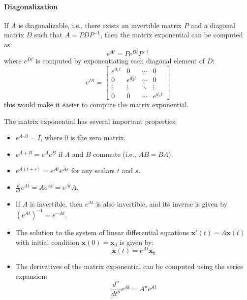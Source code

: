 \documentclass[11pt]{article}
\begin{document}
\paragraph{Diagonalization} If \( A \) is diagonalizable, i.e., there exists an invertible matrix \( P \) and a diagonal matrix \( D \) such that \( A = PDP^{-1} \), then the matrix exponential can be computed as:
\begin{equation}
e^{At} = Pe^{Dt}P^{-1}
\end{equation}
where \( e^{Dt} \) is computed by exponentiating each diagonal element of \( D \):
\begin{equation}
e^{Dt} = \begin{bmatrix}
e^{d_1t} & 0 & \cdots & 0 \\
0 & e^{d_2t} & \cdots & 0 \\
\vdots & \vdots & \ddots & \vdots \\
0 & 0 & \cdots & e^{d_nt}
\end{bmatrix}
\end{equation}
this would make it easier to compute the matrix exponential.

\begin{definition}
    The matrix exponential has several important properties:
    \begin{itemize}
        \item \( e^{A \cdot 0} = I \), where \( 0 \) is the zero matrix.
        \item \( e^{A+B} = e^{A}e^{B} \) if \( A \) and \( B \) commute (i.e., \( AB = BA \)).
        \item \( e^{A(t+s)} = e^{At}e^{As} \) for any scalars \( t \) and \( s \).
        \item \( \frac{d}{dt}e^{At} = Ae^{At} = e^{At}A \).
        \item If \( A \) is invertible, then \( e^{At} \) is also invertible, and its inverse is given by \( (e^{At})^{-1} = e^{-At} \).
        \item The solution to the system of linear differential equations \( \mathbf{x}'(t) = A\mathbf{x}(t) \) with initial condition \( \mathbf{x}(0) = \mathbf{x}_0 \) is given by:
        \begin{equation}
        \mathbf{x}(t) = e^{At}\mathbf{x}_0
        \end{equation}
        \item The derivatives of the matrix exponential can be computed using the series expansion:
        \begin{equation}
        \frac{d^n}{dt^n}e^{At} = A^n e^{At}
        \end{equation}
    \end{itemize}
\end{definition}
\end{document}
